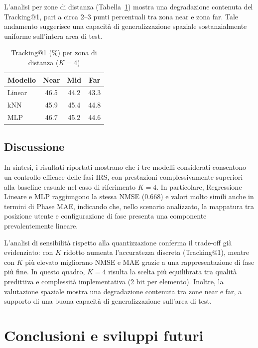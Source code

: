 \documentclass[12pt,a4paper]{report}
\begin{document}
L'analisi per zone di distanza (Tabella~\ref{tab:results_by_zone})
mostra una degradazione contenuta del Tracking@1, pari a circa 2--3
punti percentuali tra zona near e zona far. Tale andamento suggerisce
una capacità di generalizzazione spaziale sostanzialmente uniforme
sull'intera area di test.

\begin{table}[ht]
  \centering
  \caption{Tracking@1 (\%) per zona di distanza ($K=4$)}
  \label{tab:results_by_zone}
  \begin{tabular}{lccc}
    \hline
    \textbf{Modello} & \textbf{Near} & \textbf{Mid} & \textbf{Far} \\
    \hline
    Linear  & 46.5 & 44.2 & 43.3 \\
    kNN     & 45.9 & 45.4 & 44.8 \\
    MLP     & 46.7 & 45.2 & 44.6 \\
    \hline
  \end{tabular}
\end{table}

\section{Discussione}
In sintesi, i risultati riportati mostrano che i tre modelli
considerati consentono un controllo efficace delle fasi IRS, con
prestazioni complessivamente superiori alla baseline casuale nel caso
di riferimento $K=4$. In particolare, Regressione Lineare e MLP
raggiungono la stessa NMSE (0.668) e valori molto simili anche in
termini di Phase MAE, indicando che, nello scenario analizzato, la
mappatura tra posizione utente e configurazione di fase presenta una
componente prevalentemente lineare.

L'analisi di sensibilità rispetto alla quantizzazione conferma il
trade-off già evidenziato: con $K$ ridotto aumenta l'accuratezza
discreta (Tracking@1), mentre con $K$ più elevato migliorano NMSE e
MAE grazie a una rappresentazione di fase più fine. In questo quadro,
$K=4$ risulta la scelta più equilibrata tra qualità predittiva e
complessità implementativa (2 bit per elemento). Inoltre, la
valutazione spaziale mostra una degradazione contenuta tra zone near
e far, a supporto di una buona capacità di generalizzazione sull'area di test.

\chapter{Conclusioni e sviluppi futuri}
\label{chap:conclusioni}
\end{document}
